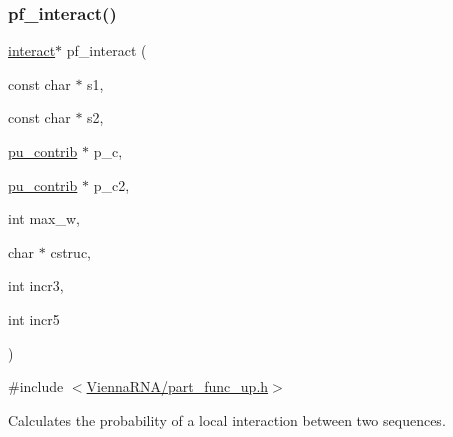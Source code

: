 \subsubsection{\texorpdfstring{pf\_interact()}{pf\_interact()}}
{\footnotesize\ttfamily \mbox{\hyperlink{group__data__structures_structinteract}{interact}}$\ast$ pf\+\_\+interact (\begin{DoxyParamCaption}\item[{const char $\ast$}]{s1,  }\item[{const char $\ast$}]{s2,  }\item[{\mbox{\hyperlink{group__data__structures_structpu__contrib}{pu\+\_\+contrib}} $\ast$}]{p\+\_\+c,  }\item[{\mbox{\hyperlink{group__data__structures_structpu__contrib}{pu\+\_\+contrib}} $\ast$}]{p\+\_\+c2,  }\item[{int}]{max\+\_\+w,  }\item[{char $\ast$}]{cstruc,  }\item[{int}]{incr3,  }\item[{int}]{incr5 }\end{DoxyParamCaption})}



{\ttfamily \#include $<$\mbox{\hyperlink{part__func__up_8h}{Vienna\+R\+N\+A/part\+\_\+func\+\_\+up.\+h}}$>$}



Calculates the probability of a local interaction between two sequences. 

